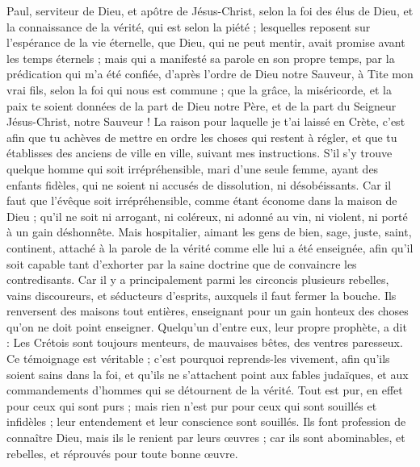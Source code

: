 \begin{multicols}{2}
\TextTitle{[Introductions]}
\VerseOne{}Paul, serviteur de Dieu, et apôtre de Jésus-Christ, selon la foi des élus de Dieu, et la connaissance de la vérité, qui est selon la piété ;
lesquelles reposent sur l'espérance de la vie éternelle, que Dieu, qui ne peut mentir, avait promise avant les temps éternels ;
mais qui a manifesté sa parole en son propre temps, par la prédication qui m’a été confiée, d’après l’ordre de Dieu notre Sauveur,
à Tite mon vrai fils, selon la foi qui nous est commune ; que la grâce, la miséricorde, et la paix te soient données de la part de Dieu notre Père, et de la part du Seigneur Jésus-Christ, notre Sauveur !
La raison pour laquelle je t'ai laissé en Crète, c'est afin que tu achèves de mettre en ordre les choses qui restent à régler, et que tu établisses des anciens de ville en ville, suivant mes instructions.
S’il s’y trouve quelque homme qui soit irrépréhensible, mari d'une seule femme, ayant des enfants fidèles, qui ne soient ni accusés de dissolution, ni désobéissants.
Car il faut que l'évêque soit irrépréhensible, comme étant économe dans la maison de Dieu ; qu’il ne soit ni arrogant, ni coléreux, ni adonné au vin, ni violent, ni porté à un gain déshonnête.
Mais hospitalier, aimant les gens de bien, sage, juste, saint, continent,
attaché à la parole de la vérité comme elle lui a été enseignée, afin qu'il soit capable tant d'exhorter par la saine doctrine que de convaincre les contredisants.
Car il y a principalement parmi les circoncis plusieurs rebelles, vains discoureurs, et séducteurs d'esprits,
auxquels il faut fermer la bouche. Ils renversent des maisons tout entières, enseignant pour un gain honteux des choses qu'on ne doit point enseigner.
Quelqu'un d'entre eux, leur propre prophète, a dit : Les Crétois sont toujours menteurs, de mauvaises bêtes, des ventres paresseux.
Ce témoignage est véritable ; c'est pourquoi reprends-les vivement, afin qu'ils soient sains dans la foi,
et qu’ils ne s’attachent point aux fables judaïques, et aux commandements d’hommes qui se détournent de la vérité.
Tout est pur, en effet pour ceux qui sont purs ; mais rien n'est pur pour ceux qui sont souillés et infidèles ; leur entendement et leur conscience sont souillés.
Ils font profession de connaître Dieu, mais ils le renient par leurs œuvres ; car ils sont abominables, et rebelles, et réprouvés pour toute bonne œuvre.

\end{multicols}

